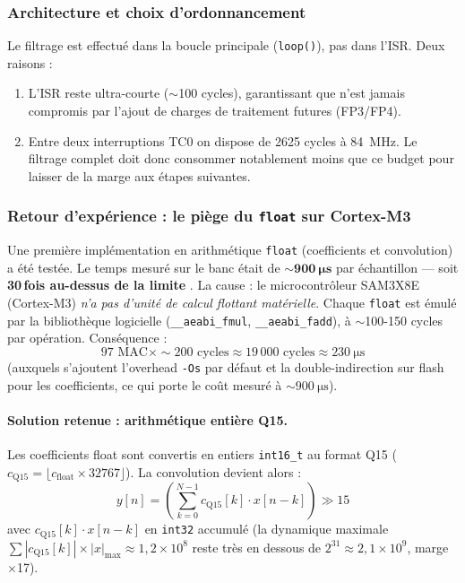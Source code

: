 \subsubsection{Architecture et choix d'ordonnancement}

Le filtrage est effectué dans la boucle principale (\texttt{loop()}), pas dans l'ISR. Deux raisons :
\begin{enumerate}
    \item L'ISR reste ultra-courte ($\sim$100 cycles), garantissant que  n'est jamais compromis par l'ajout de charges de traitement futures (FP3/FP4).
    \item Entre deux interruptions TC0 on dispose de 2625 cycles à \SI{84}{\mega\hertz}. Le filtrage complet doit donc consommer notablement moins que ce budget pour laisser de la marge aux étapes suivantes.
\end{enumerate}

\subsubsection{Retour d'expérience : le piège du \texttt{float} sur Cortex-M3}

Une première implémentation en arithmétique \texttt{float} (coefficients et convolution) a été testée. Le temps mesuré sur le banc était de $\mathbf{\sim \SI{900}{\micro\second}}$ par échantillon --- soit \textbf{30\,fois au-dessus de la limite }. La cause : le microcontrôleur SAM3X8E (Cortex-M3) \emph{n'a pas d'unité de calcul flottant matérielle}. Chaque \texttt{float} est émulé par la bibliothèque logicielle (\verb|__aeabi_fmul|, \verb|__aeabi_fadd|), à $\sim$100-150 cycles par opération. Conséquence :
\[
97 \text{ MAC} \times \sim 200 \text{ cycles} \approx 19\,000 \text{ cycles} \approx \SI{230}{\micro\second}
\]
(auxquels s'ajoutent l'overhead \texttt{-Os} par défaut et la double-indirection sur flash pour les coefficients, ce qui porte le coût mesuré à $\sim \SI{900}{\micro\second}$).

\paragraph{Solution retenue : arithmétique entière Q15.} Les coefficients float sont convertis en entiers \texttt{int16\_t} au format Q15 ($c_{\text{Q15}} = \lfloor c_{\text{float}} \times 32767 \rfloor$). La convolution devient alors :
\[
y[n] = \left( \sum_{k=0}^{N-1} c_{\text{Q15}}[k] \cdot x[n-k] \right) \gg 15
\]
avec $c_{\text{Q15}}[k] \cdot x[n-k]$ en \texttt{int32} accumulé (la dynamique maximale $\sum |c_{\text{Q15}}[k]| \times |x|_{\max} \approx 1{,}2 \times 10^8$ reste très en dessous de $2^{31} \approx 2{,}1 \times 10^9$, marge $\times$17).

